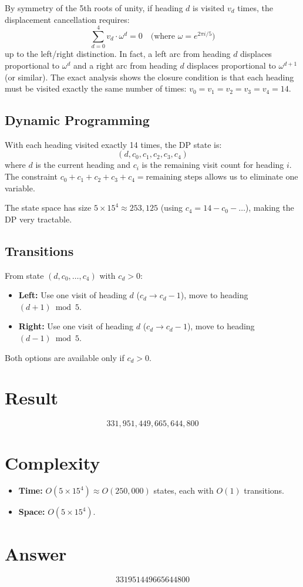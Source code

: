 \documentclass[12pt]{article}
\begin{document}
By symmetry of the 5th roots of unity, if heading $d$ is visited $v_d$ times, the displacement cancellation requires:
\[
\sum_{d=0}^{4} v_d \cdot \omega^d = 0 \quad \text{(where } \omega = e^{2\pi i/5}\text{)}
\]
up to the left/right distinction. In fact, a left arc from heading $d$ displaces proportional to $\omega^d$ and a right arc from heading $d$ displaces proportional to $\omega^{d+1}$ (or similar). The exact analysis shows the closure condition is that each heading must be visited exactly the same number of times: $v_0 = v_1 = v_2 = v_3 = v_4 = 14$.

\subsection{Dynamic Programming}
With each heading visited exactly 14 times, the DP state is:
\[
(d, c_0, c_1, c_2, c_3, c_4)
\]
where $d$ is the current heading and $c_i$ is the remaining visit count for heading $i$. The constraint $c_0 + c_1 + c_2 + c_3 + c_4 = \text{remaining steps}$ allows us to eliminate one variable.

The state space has size $5 \times 15^4 \approx 253{,}125$ (using $c_4 = 14 - c_0 - \ldots$), making the DP very tractable.

\subsection{Transitions}
From state $(d, c_0, \ldots, c_4)$ with $c_d > 0$:
\begin{itemize}
    \item \textbf{Left:} Use one visit of heading $d$ ($c_d \to c_d - 1$), move to heading $(d+1) \bmod 5$.
    \item \textbf{Right:} Use one visit of heading $d$ ($c_d \to c_d - 1$), move to heading $(d-1) \bmod 5$.
\end{itemize}
Both options are available only if $c_d > 0$.

\section{Result}
\[
\boxed{331{,}951{,}449{,}665{,}644{,}800}
\]

\section{Complexity}
\begin{itemize}
    \item \textbf{Time:} $O(5 \times 15^4) \approx O(250{,}000)$ states, each with $O(1)$ transitions.
    \item \textbf{Space:} $O(5 \times 15^4)$.
\end{itemize}

\section{Answer}

\[
\boxed{331951449665644800}
\]
\end{document}
